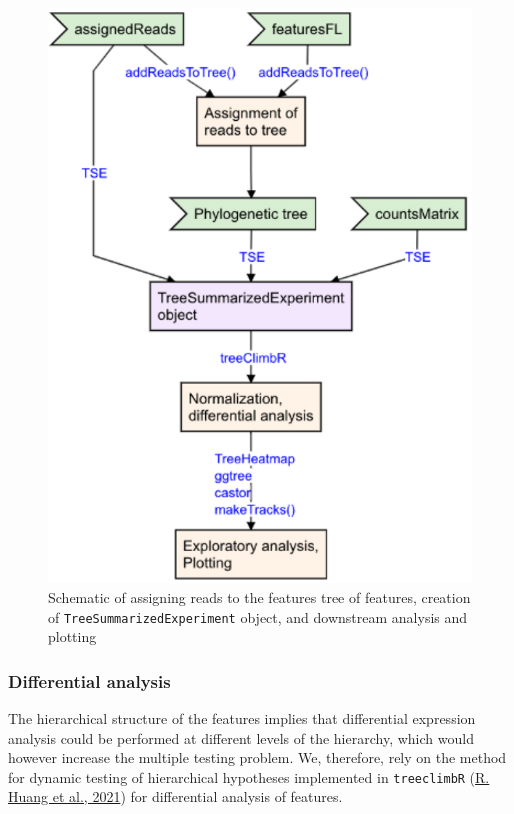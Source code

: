 \documentclass[12pt,twoside]{reedthesis}
\begin{document}
\begin{figure}[htbp]

{\centering \includegraphics{thesis_files/figure-latex/3f12-1} 

}

\caption{Schematic of assigning reads to the features tree of features, creation of \texttt{TreeSummarizedExperiment} object, and downstream analysis and plotting}\label{fig:3f12}
\end{figure}
\hypertarget{differential-analysis}{%
\subsubsection{Differential analysis}\label{differential-analysis}}

The hierarchical structure of the features implies that differential
expression analysis could be performed at different levels of the
hierarchy, which would however increase the multiple testing problem.
We, therefore, rely on the method for dynamic testing of hierarchical
hypotheses implemented in \texttt{treeclimbR} (\protect\hyperlink{ref-huang2021}{R. Huang et al., 2021}) for differential
analysis of features.
\end{document}
